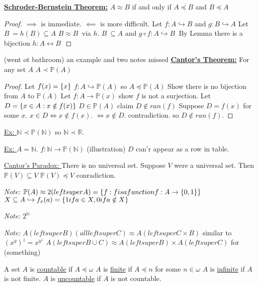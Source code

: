\underline{\textbf{Schroder-Bernstein Theorem:}} $A \approx B$ if and only if $A \preceq B$ and $B \preceq A$
\begin{proof}
    $\implies$ is immediate.
    $\impliedby$ is more difficult.
    Let $f : A \hookrightarrow B$ and $g : B \hookrightarrow A$
    Let $B^~ = h(B) \subseteq A$
    $B \approx B^~$ via $h$.
    $B^~ \subseteq A$ and $g \circ f : A \hookrightarrow B^~$
    By Lemma there is a bijection $h : A \leftrightarrow B^~$
    \end{proof}
    (went ot bathroom)
    an example and two notes missed
\textbf{\underline{Cantor's Theorem:}} For any set $A$ $A \prec \mathbb{P}(A)$
\begin{proof}
    Let $f(x) = \{x\}$ $f : A \hookrightarrow \mathbb{P}(A)$ so $A \preceq \mathbb{P}(A)$
    Show there is no bijection from $A$ to $\mathbb{P}(A)$
    Let $f : A \rightarrow \mathbb{P}(x)$
    show $f$ is not a surjection.
    Let $D = \{x \in A : x \notin f(x)\}$
    $D \in \mathbb{P}(A)$
    claim $D \notin ran(f)$
    Suppose $D = f(x)$ for some $x$.
    $x \in D \iff x \notin f(x)$.
    $\iff x \notin D$.
    contradiction.
    so $D \notin ran(f)$.
    \end{proof}

\underline{Ex: } $\mathbb{N} \prec \mathbb{P}(\mathbb{N})$ so $\mathbb{N} \prec \mathbb{R}$.

\underline{Ex: } $ A = \mathbb{N}$.
$f : \mathbb{N} \rightarrow \mathbb{P}(\mathbb{N})$
(illustration)
$D$ can'r appear as a row in table.

\underline{Cantor's Paradox: } There is no universal set.
Suppose $V$ were a universal set.
Then $\mathbb{P}(V) \subseteq V$
$\mathbb{P}(V) \preceq V$
conradiction.

\emph{Note: } $\mathbb{P}(A) \approx 2 (left super A) = \{f : f is a function f: A \rightarrow \{0,1\}\}$
$X \subseteq A \hookrightarrow f_x(a) = \{1 if a \in X, 0 if a \notin X\}$

\emph{Note: } $2^{\mathbb{N}}$

\emph{Note: } $A (left super B) (all left super C) \approx A (left super C \times B)$ similar to $(x^y)^z = x^y^z$
$A (left super B \cup C) \approx A (left super B) \times A (left super C)$ for (something)

 A set $A$ is \underline{countable} if $A \preceq \omega$
$A$ is \underline{finite} if $A \preceq n$ for some $n \in \omega$
$A$ is \underline{infinite} if $A$ is not finite.
$A$ is \underline{uncountable} if $A$ is not countable.

